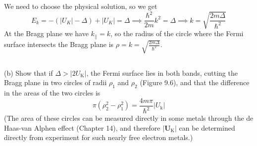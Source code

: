 \documentclass[12pt]{article}
\begin{document}
We need to choose the physical solution, so we get
\begin{equation}
    E_k = -\left( |U_K| - \Delta\right) + |U_K| = \Delta \implies \frac{\hbar^2}{2m}k^2 = \Delta \implies k = \sqrt{\frac{2m\Delta}{\hbar^2}}
\end{equation}
At the Bragg plane we have $k_{||} = k$, so the radius of the circle where the Fermi surface intersects the Bragg plane is $\rho = k = \sqrt{\frac{2m\Delta}{\hbar^2}}$.


\subsection{}
(b) Show that if $\Delta>\left|2 U_{\mathrm{K}}\right|$, the Fermi surface lies in both bands, cutting the Bragg plane in two circles of radii $\rho_1$ and $\rho_2$ (Figure 9.6), and that the difference in the areas of the two circles is
$$
\pi\left(\rho_2^2-\rho_1^2\right)=\frac{4 m \pi}{\hbar^2}\left|U_{\mathrm{k}}\right|
$$
(The area of these circles can be measured directly in some metals through the de Haas-van Alphen effect (Chapter 14), and therefore $\left|\boldsymbol{U}_{\mathrm{K}}\right|$ can be determined directly from experiment for such nearly free electron metals.)
\end{document}
